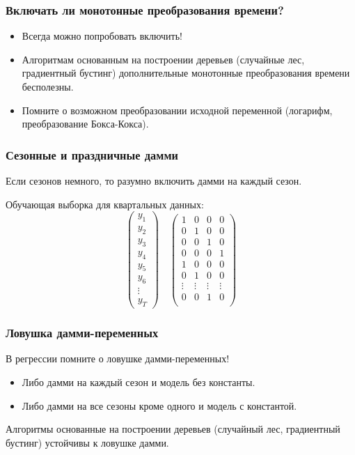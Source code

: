 \begin{frame}
  \frametitle{Включать ли монотонные преобразования времени?}

  \begin{itemize}[<+->]
    \item Всегда \alert{можно попробовать} включить!
    \item Алгоритмам основанным на построении \alert{деревьев} (случайные лес, градиентный бустинг)
    дополнительные монотонные преобразования времени \alert{бесполезны}. 
    \item Помните о возможном преобразовании \alert{исходной переменной} (логарифм, преобразование Бокса-Кокса).
  \end{itemize}
\end{frame}

\begin{frame}
  \frametitle{Сезонные и праздничные дамми}

  Если сезонов \alert{немного}, то разумно включить дамми на каждый сезон.

  \pause
  \alert{Обучающая} выборка для квартальных данных:
  \[
  \begin{pmatrix}
    y_1 \\
    y_2 \\
    y_3 \\
    y_4 \\
    y_5 \\
    y_6 \\
    \vdots \\
    y_T 
  \end{pmatrix}  \quad 
  \begin{pmatrix}
    1 & 0 & 0 & 0 \\
    0 & 1 & 0 & 0 \\
    0 & 0 & 1 & 0 \\
    0 & 0 & 0 & 1 \\
    1 & 0 & 0 & 0 \\
    0 & 1 & 0 & 0 \\
    \vdots & \vdots &  \vdots & \vdots \\
    0 & 0 & 1 & 0 \\
  \end{pmatrix}
  \]
\end{frame}


\begin{frame}
  \frametitle{Ловушка дамми-переменных}

  
  В \alert{регрессии} помните о \alert{ловушке} дамми-переменных! \pause 
  
  \begin{itemize}[<+->]
    \item Либо дамми на каждый сезон и модель без константы.
    \item Либо дамми на все сезоны кроме одного и модель с константой. 
  \end{itemize}
  
  \pause 
  Алгоритмы основанные на построении \alert{деревьев} (случайный лес, градиентный бустинг)
 \alert{устойчивы} к ловушке дамми. 
\end{frame}


